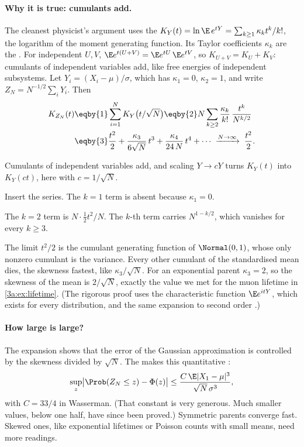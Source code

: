\paragraph{Why it is true: cumulants add.}
The cleanest physicist's argument uses the  $K_Y(t)=\ln\E\,e^{tY}=\sum_{k\ge1}\kappa_k t^k/k!$, the logarithm
of the moment generating function. Its Taylor coefficients $\kappa_k$ are
the  . For independent $U,V$,
$\E e^{t(U+V)}=\E e^{tU}\,\E e^{tV}$, so $K_{U+V}=K_U+K_V$: cumulants of
independent variables add, like free energies of independent subsystems.
Let $Y_i=(X_i-\mu)/\sigma$, which has $\kappa_1=0$, $\kappa_2=1$, and write
$Z_N=N^{-1/2}\sum_iY_i$. Then
\begin{align}
  K_{Z_N}(t)
  &\eqby{1} \sum_{i=1}^N K_{Y}\bigl(t/\sqrt N\bigr)
   \eqby{2} N\sum_{k\ge2}\frac{\kappa_k}{k!}\,\frac{t^k}{N^{k/2}} \nonumber\\
  &\eqby{3} \frac{t^2}{2}+\frac{\kappa_3}{6\sqrt N}\,t^3+\frac{\kappa_4}{24\,N}\,t^4+\cdots
   \;\xrightarrow{N\to\infty}\;\frac{t^2}{2}.
  \label{3a:eq:clt-cumulants}
\end{align}
\begin{explain}
  \item Cumulants of independent variables add, and scaling $Y\to cY$ turns
        $K_Y(t)$ into $K_Y(ct)$, here with $c=1/\sqrt N$.
  \item Insert the series. The $k=1$ term is absent because $\kappa_1=0$.
  \item The $k=2$ term is $N\cdot\tfrac12t^2/N$. The $k$-th term carries
        $N^{1-k/2}$, which vanishes for every $k\ge3$.
\end{explain}
The limit $t^2/2$ is the cumulant generating function of $\Normal(0,1)$,
whose only nonzero cumulant is the variance. Every other cumulant of the
standardised mean dies, the skewness fastest, like $\kappa_3/\sqrt N$. For an
exponential parent $\kappa_3=2$, so the skewness of the mean is $2/\sqrt N$,
exactly the value we met for the muon lifetime in \cref{3a:ex:lifetime}.
(The rigorous proof uses the characteristic function $\E e^{itY}$, which
exists for every distribution, and the same expansion to second order
.)

\paragraph{How large is large?}
The expansion shows that the error of the Gaussian approximation is
controlled by the skewness divided by $\sqrt N$. The  makes this quantitative :
\begin{equation}
  \sup_z\bigl|\Prob(Z_N\le z)-\Phi(z)\bigr|\le\frac{C\,\E|X_1-\mu|^3}{\sqrt N\,\sigma^3},
  \label{3a:eq:berry-esseen}
\end{equation}
with $C=33/4$ in Wasserman. (That constant is very generous. Much smaller
values, below one half, have since been proved.) Symmetric parents converge
fast. Skewed ones, like exponential lifetimes or Poisson counts with small
means, need more readings.

